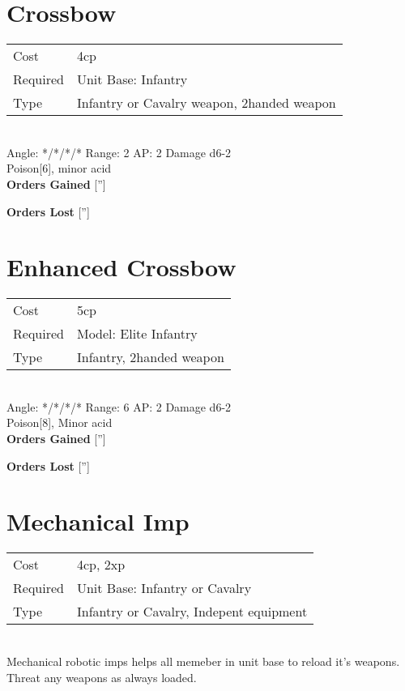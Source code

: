 \pagebreak\section{ Crossbow }

\begin{tabular}{ll}
    Cost & 4cp \\
    Required & Unit Base: Infantry\\
    Type & Infantry or Cavalry weapon, 2handed weapon\\
\end{tabular}
\ \\
\indent Angle: */*/*/* Range: 2  AP: 2 Damage d6-2 \\
Poison[6], minor acid
\ \\

{\bf Orders Gained}
['']

{\bf Orders Lost}
['']
\section{ Enhanced Crossbow }

\begin{tabular}{ll}
    Cost & 5cp \\
    Required & Model: Elite Infantry\\
    Type & Infantry, 2handed weapon\\
\end{tabular}
\ \\
\indent Angle: */*/*/* Range: 6  AP: 2 Damage d6-2 \\
Poison[8], Minor acid
\ \\

{\bf Orders Gained}
['']

{\bf Orders Lost}
['']
\section{ Mechanical Imp }

\begin{tabular}{ll}
    Cost & 4cp, 2xp \\
    Required & Unit Base: Infantry or Cavalry\\
    Type & Infantry or Cavalry, Indepent equipment\\
\end{tabular}
\ \\
Mechanical robotic imps helps all memeber in unit base to reload it's weapons. Threat any weapons as always loaded. \\

